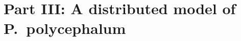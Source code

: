 \documentclass[	hyperref={pdfpagelabels=false}, xcolor=dvipsnames,
		11pt]{beamer}
\begin{document}


\section{Part III: A distributed model of P.~polycephalum} 
\end{document}
